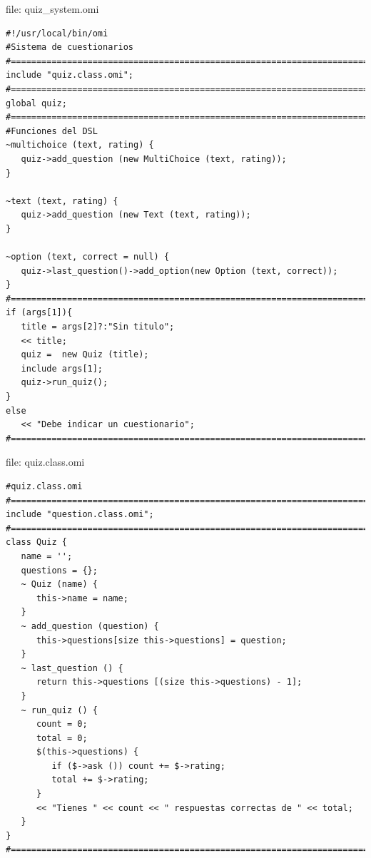 file: quiz\_system.omi
\begin{lstlisting}
#!/usr/local/bin/omi
#Sistema de cuestionarios
#=======================================================================
include "quiz.class.omi";
#=======================================================================
global quiz;
#=======================================================================
#Funciones del DSL 
~multichoice (text, rating) {
   quiz->add_question (new MultiChoice (text, rating));
}

~text (text, rating) {
   quiz->add_question (new Text (text, rating));
}

~option (text, correct = null) {
   quiz->last_question()->add_option(new Option (text, correct));
}
#=======================================================================
if (args[1]){
   title = args[2]?:"Sin titulo";
   << title;
   quiz =  new Quiz (title);
   include args[1];
   quiz->run_quiz();
}
else
   << "Debe indicar un cuestionario";
#=======================================================================
\end{lstlisting}
\pagebreak
file: quiz.class.omi
\begin{lstlisting}
#quiz.class.omi
#=======================================================================
include "question.class.omi";
#=======================================================================
class Quiz {
   name = '';
   questions = {};
   ~ Quiz (name) {
      this->name = name;
   }
   ~ add_question (question) {
      this->questions[size this->questions] = question;
   }
   ~ last_question () {
      return this->questions [(size this->questions) - 1];
   }
   ~ run_quiz () {
      count = 0;
      total = 0;
      $(this->questions) {
         if ($->ask ()) count += $->rating;
         total += $->rating;
      }
      << "Tienes " << count << " respuestas correctas de " << total;
   }
}
#=======================================================================
\end{lstlisting}

